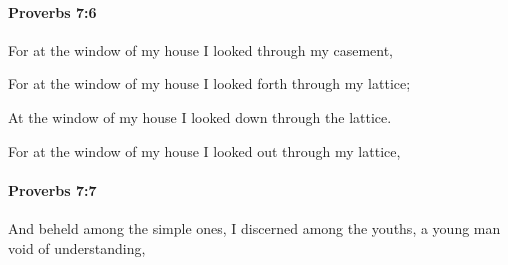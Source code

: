 		\paragraph{Proverbs 7:6} %
			\label{PROVERBS-7-6}

			For at the window of my house I looked through my casement,

			\begin{versebox}
					\item[BHS] 
					\item[ASV] For at the window of my house I looked forth through my lattice;
					\item[NIV] At the window of my house I looked down through the lattice.
					\item[NRSV] For at the window of my house I looked out through my lattice,
			\end{versebox}

		\paragraph{Proverbs 7:7} %
			\label{PROVERBS-7-7}

			And beheld among the simple ones, I discerned among the youths, a young man void of understanding,

